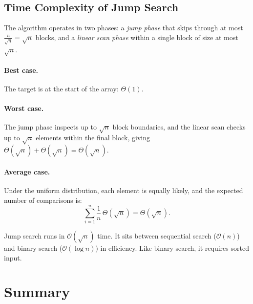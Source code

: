 \documentclass[11pt, a4paper, notitlepage]{report}
\theoremstyle{definition}
\theoremstyle{remark}
\theoremstyle{definition}
\begin{document}
\subsection{Time Complexity of Jump Search}
\label{subsec:jump-time}

The algorithm operates in two phases: a \emph{jump phase} that skips through at
most $\frac{n}{\sqrt{n}} = \sqrt{n}$ blocks, and a \emph{linear scan phase}
within a single block of size at most $\sqrt{n}$.

\paragraph{Best case.}
The target is at the start of the array: $\Theta(1)$.

\paragraph{Worst case.}
The jump phase inspects up to $\sqrt{n}$ block boundaries, and the linear scan
checks up to $\sqrt{n}$ elements within the final block, giving
$\Theta(\sqrt{n}) + \Theta(\sqrt{n}) = \Theta(\sqrt{n})$.

\paragraph{Average case.}
Under the uniform distribution, each element is equally likely, and the expected
number of comparisons is:
\[
  \sum_{i=1}^{n} \frac{1}{n}\,\Theta\!\left(\sqrt{n}\right) = \Theta\!\left(\sqrt{n}\right).
\]

\begin{keyresult}[title={Jump Search Complexity}]
Jump search runs in $\mathcal{O}(\sqrt{n})$ time.  It sits between sequential
search ($\mathcal{O}(n)$) and binary search ($\mathcal{O}(\log n)$) in
efficiency.  Like binary search, it requires sorted input.
\end{keyresult}

\section{Summary}
\label{sec:searching-summary}
\end{document}
